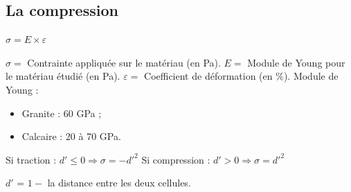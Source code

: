 \documentclass{beamer}
\begin{document}
\subsection{La compression}
\begin{frame}
  \begin{center}
    $\sigma = E \times \varepsilon$
  \end{center}
  $\sigma = $ Contrainte appliquée sur le matériau (en Pa). $E = $ Module de Young pour le matériau étudié (en Pa). $\varepsilon = $ Coefficient de déformation (en $\%$). \smallbreak
  Module de Young :
  \begin{itemize}
    \item Granite : 60 GPa ;
    \item Calcaire : 20 à 70 GPa.
  \end{itemize}
  \smallbreak
  \begin{center}
    Si traction : $d' \leqslant 0 \Rightarrow \sigma = -d'^2$ \medbreak
    Si compression : $d' > 0 \Rightarrow \sigma = d'^2$
  \end{center}
  $d'$ = $1 -$ la distance entre les deux cellules. \\
\end{frame}
\end{document}

